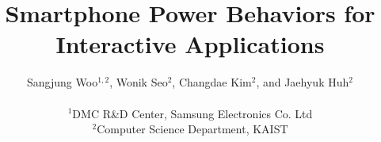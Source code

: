 \documentclass[letterpaper,twocolumn,10pt]{article}
\begin{document}
\date{}

\title{\Large \bf Smartphone Power Behaviors for Interactive Applications}



\author{{\rm Sangjung Woo$^{1, 2}$, Wonik Seo$^{2}$, Changdae Kim$^{2}$, and Jaehyuk Huh$^{2}$} \\ \\
$^{1}$DMC R\&D Center, Samsung Electronics Co. Ltd \\
\vspace{0.05in}
$^{2}$Computer Science Department, KAIST \\
\vspace{0.05in}
}



\maketitle










{\footnotesize 
}


\end{document}
